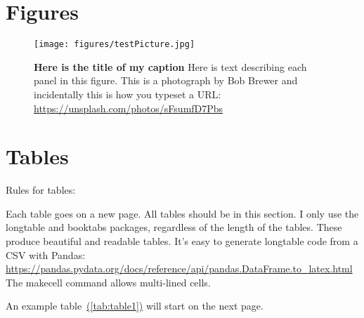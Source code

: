 \documentclass{getwriting}
\begin{document}
\section{Figures}\label{figures}
\begin{figure}[H]
\texttt{[image: figures/testPicture.jpg]}
\caption{\textbf{Here is the title of my caption} Here is text describing each panel in this figure. This is a photograph by Bob Brewer and incidentally this is how you typeset a URL: \url{https://unsplash.com/photos/sFsumfD7Pbs}}
\label{fig:figure1}
\end{figure}
\newpage
\section{Tables}
Rules for tables:
\begin{outline}
\1 Each table goes on a new page. All tables should be in this section.
\1 I only use the longtable and booktabs packages, regardless of the length of the tables. These produce beautiful and readable tables. It's easy to generate longtable code from a CSV with Pandas: \url{https://pandas.pydata.org/docs/reference/api/pandas.DataFrame.to_latex.html}
\1 The makecell command allows multi-lined cells.
\end{outline}
\par
An example table~\hyperref[tab:table1]{(\autoref{tab:table1})} will start on the next page.
\newpage
\end{document}
